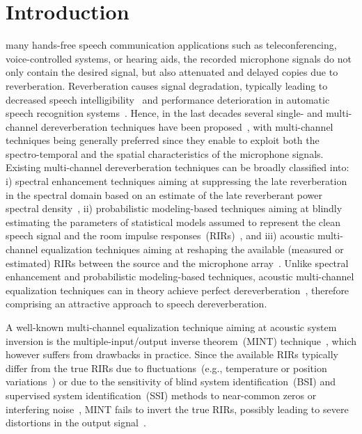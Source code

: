 \documentclass[10pt]{IEEEtran}
\begin{document}
\section{Introduction}

 many hands-free speech communication applications such as teleconferencing, voice-controlled systems, or hearing aids, the recorded microphone signals do not only contain the desired signal, but also attenuated and delayed copies due to reverberation.
Reverberation causes signal degradation, typically leading to decreased speech intelligibility~\cite{Beutelmann_2006,Goetze_AES_2010,Warzybok_IWAENC_2014} and performance deterioration in automatic speech recognition systems~\cite{Yoshioka_ISPM_2012,Xiong_EURASIP_2015}.
Hence, in the last decades several single- and multi-channel dereverberation techniques have been proposed~\cite{Naylor_Derev_book}, with multi-channel techniques being generally preferred since they enable to exploit both the spectro-temporal and the spatial characteristics of the microphone signals. 
Existing multi-channel dereverberation techniques can be broadly classified into: i) spectral enhancement techniques aiming at suppressing the late reverberation in the spectral domain based on an estimate of the late reverberant power spectral density~\cite{Lebart_ACUSTICA_2001,Habets2009a,Braun_EURASIP_2015,Kuklasinski_ITASLP_2016}, ii) probabilistic modeling-based techniques aiming at blindly estimating the parameters of statistical models assumed to represent the clean speech signal and the room impulse responses~(RIRs)~\cite{Nakatani_ITASLP_2010,Schmid_ITASLP_2014,Schwartz_ITASLP_2015,Jukic_ITASLP_2015}, and iii) acoustic  multi-channel equalization techniques aiming at reshaping the available (measured or estimated) RIRs between the source and the microphone array~\cite{Miyoshi_ITASS_1988, Kallinger_ICASSP_2006,Jungmann_ITASLP_2012, Lim_ITASLP_2014, Kodrasi_ITASLP_2013, Rashobh_ITASLP_2014}.
Unlike spectral enhancement and probabilistic modeling-based techniques, acoustic multi-channel equalization techniques can in theory achieve perfect dereverberation~\cite{Miyoshi_ITASS_1988,Hacihabibouglu_ITASLP_2012}, therefore comprising an attractive approach to speech dereverberation.

A well-known multi-channel equalization technique aiming at acoustic system inversion is the multiple-input/output inverse theorem~(MINT) technique~\cite{Miyoshi_ITASS_1988}, which however suffers from drawbacks in practice. 
Since the available RIRs typically differ from the true RIRs due to fluctuations~(e.g., temperature or position variations~\cite{Radlovic_ITSA_2000}) or due to the sensitivity of blind system identification~(BSI) and supervised system identification~(SSI) methods to near-common zeros or interfering noise~\cite{Khong_ICASSP_2008,Haque_SPL_2008,Hu_EUSIPCO_2015}, MINT fails to invert the true RIRs, possibly leading to severe distortions in the output signal~\cite{Hikichi_EURASIP_2007,Kodrasi_ITASLP_2013,Lim_ITASLP_2014}.
\end{document}

